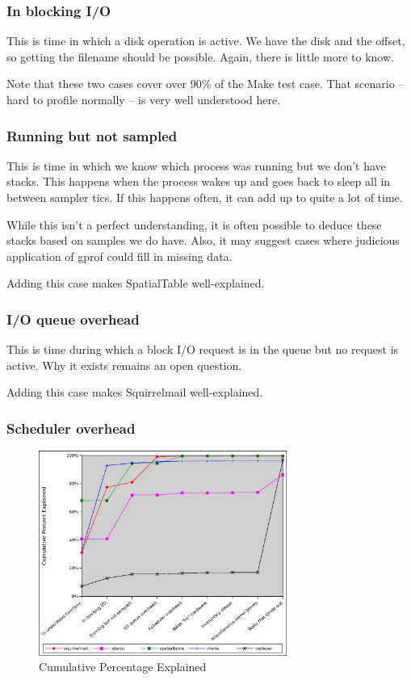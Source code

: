 \documentclass[10pt]{article}
\begin{document}
\subsubsection{In blocking I/O}

This is time in which a disk operation is active.  We have the disk and the offset, so getting the filename should be possible.  Again, there is little more to know.

Note that these two cases cover over 90\% of the Make test case.  That scenario -- hard to profile normally -- is very well understood here.

\subsubsection{Running but not sampled}

This is time in which we know which process was running but we don't have stacks.  This happens when the process wakes up and goes back to sleep all in between sampler tics.  If this happens often, it can add up to quite a lot of time.

While this isn't a perfect understanding, it is often possible to deduce these stacks based on samples we do have.  Also, it may suggest cases where judicious application of gprof could fill in missing data.

Adding this case makes SpatialTable well-explained.

\subsubsection{I/O queue overhead}

This is time during which a block I/O request is in the queue but no request is active.  Why it exists remains an open question.

Adding this case makes Squirrelmail well-explained.

\subsubsection{Scheduler overhead}
\begin{figure}[b!]
\includegraphics[width=3.2in]{images/5cumugraph}
\caption{Cumulative Percentage Explained}
\label{fig:resgraph}
\end{figure}
\end{document}
